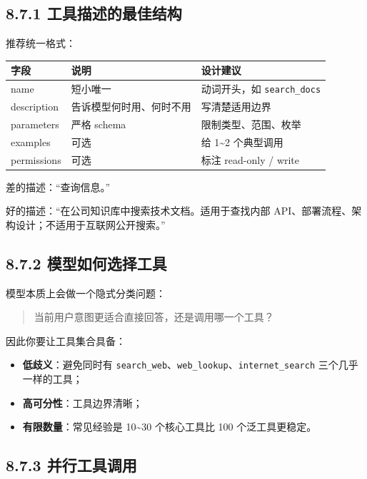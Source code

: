 \subsection{8.7.1 工具描述的最佳结构}

推荐统一格式：


\begingroup
\scriptsize
\setlength{\tabcolsep}{3pt}
\begin{longtable}{|p{}|p{}|p{}|}
\hline
字段 & 说明 & 设计建议 \\ \hline
name & 短小唯一 & 动词开头，如 \texttt{search\_docs} \\ \hline
description & 告诉模型何时用、何时不用 & 写清楚适用边界 \\ \hline
parameters & 严格 schema & 限制类型、范围、枚举 \\ \hline
examples & 可选 & 给 1\textasciitilde{}2 个典型调用 \\ \hline
permissions & 可选 & 标注 read-only / write \\ \hline
\end{longtable}
\endgroup

差的描述：``查询信息。''


好的描述：``在公司知识库中搜索技术文档。适用于查找内部 API、部署流程、架构设计；不适用于互联网公开搜索。''


\subsection{8.7.2 模型如何选择工具}

模型本质上会做一个隐式分类问题：


\begin{quote}
当前用户意图更适合直接回答，还是调用哪一个工具？\\
\end{quote}

因此你要让工具集合具备：


\begin{itemize}[leftmargin=2em]
\item \textbf{低歧义}：避免同时有 \texttt{search\_web}、\texttt{web\_lookup}、\texttt{internet\_search} 三个几乎一样的工具；
\item \textbf{高可分性}：工具边界清晰；
\item \textbf{有限数量}：常见经验是 10\textasciitilde{}30 个核心工具比 100 个泛工具更稳定。
\end{itemize}

\subsection{8.7.3 并行工具调用}

